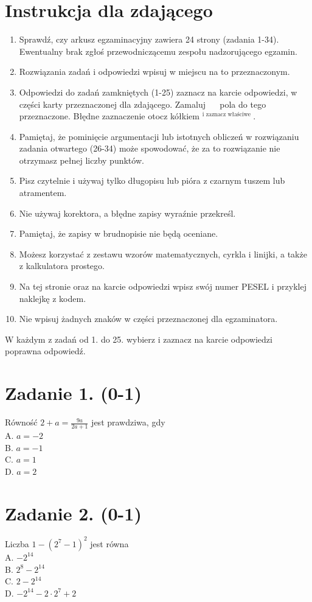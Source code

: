 \documentclass[10pt]{article}
\begin{document}
\section*{Instrukcja dla zdającego}
\begin{enumerate}
  \item Sprawdź, czy arkusz egzaminacyjny zawiera 24 strony (zadania 1-34). Ewentualny brak zgłoś przewodniczącemu zespołu nadzorującego egzamin.
  \item Rozwiązania zadań i odpowiedzi wpisuj w miejscu na to przeznaczonym.
  \item Odpowiedzi do zadań zamkniętych (1-25) zaznacz na karcie odpowiedzi, w części karty przeznaczonej dla zdającego. Zamaluj \(\quad\) pola do tego przeznaczone. Błędne zaznaczenie otocz kółkiem \({ }^{\text {i zaznacz właściwe }}\).
  \item Pamiętaj, że pominięcie argumentacji lub istotnych obliczeń w rozwiązaniu zadania otwartego (26-34) może spowodować, że za to rozwiązanie nie otrzymasz pełnej liczby punktów.
  \item Pisz czytelnie i używaj tylko długopisu lub pióra z czarnym tuszem lub atramentem.
  \item Nie używaj korektora, a błędne zapisy wyraźnie przekreśl.
  \item Pamiętaj, że zapisy w brudnopisie nie będą oceniane.
  \item Możesz korzystać z zestawu wzorów matematycznych, cyrkla i linijki, a także z kalkulatora prostego.
  \item Na tej stronie oraz na karcie odpowiedzi wpisz swój numer PESEL i przyklej naklejkę z kodem.
  \item Nie wpisuj żadnych znaków w części przeznaczonej dla egzaminatora.
\end{enumerate}

W każdym z zadań od 1. do 25. wybierz i zaznacz na karcie odpowiedzi poprawna odpowiedź.

\section*{Zadanie 1. (0-1)}
Równość \(2+a=\frac{9 a}{2 a+1}\) jest prawdziwa, gdy\\
A. \(a=-2\)\\
B. \(a=-1\)\\
C. \(a=1\)\\
D. \(a=2\)

\section*{Zadanie 2. (0-1)}
Liczba \(1-\left(2^{7}-1\right)^{2}\) jest równa\\
A. \(-2^{14}\)\\
B. \(2^{8}-2^{14}\)\\
C. \(2-2^{14}\)\\
D. \(-2^{14}-2 \cdot 2^{7}+2\)
\end{document}

